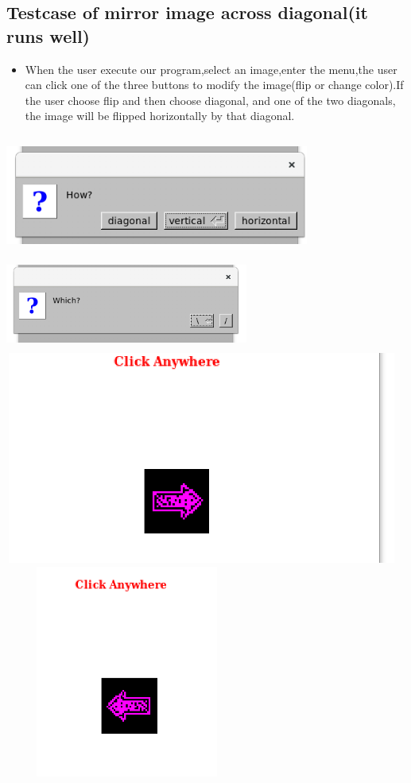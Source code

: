 \documentclass{article}
\begin{document}
\subsection*{Testcase of mirror image across diagonal(it runs well)}
\begin{itemize}
	\item When the user execute our program,select an image,enter the menu,the user can click one of the three buttons to modify the image(flip or change color).If the user choose flip and then choose diagonal, and one of the two diagonals, the image will be flipped horizontally by that diagonal.
\end{itemize}
\includegraphics[width = 10cm, height = 4cm]{d.png}
\includegraphics[width = 8cm, height = 3cm]{d2.png}
\includegraphics[width = 13cm, height = 7cm]{d3.png}
\includegraphics[width = 8cm, height = 7cm]{d4.png}
\newpage
\end{document}
